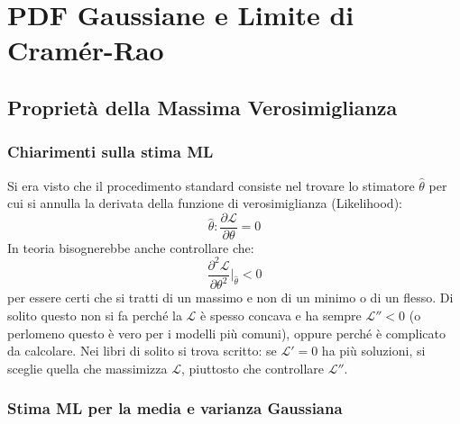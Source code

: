 \documentclass[openany,a4paper,12pt]{book}
\providecommand{\mathscr}[1]{\mathcal{#1}}
\theoremstyle{remark}
\begin{document}
\section{PDF Gaussiane e Limite di Cramér-Rao}

\subsection*{Proprietà della Massima Verosimiglianza}

\subsubsection*{Chiarimenti sulla stima ML}

Si era visto che il procedimento standard consiste nel trovare lo stimatore $\hat{\theta}$ per cui si annulla la derivata della funzione di verosimiglianza (Likelihood):
\begin{equation}
    \hat{\theta} : \frac{\partial \mathscr{L}}{\partial \theta} = 0
\end{equation}
In teoria bisognerebbe anche controllare che:
\begin{equation}
    \frac{\partial^2 \mathscr{L}}{\partial \theta^2} \Bigg|_{\hat{\theta}} < 0
\end{equation}
per essere certi che si tratti di un massimo e non di un minimo o di un flesso.
Di solito questo non si fa perché la $\mathscr{L}$ è spesso concava e ha sempre $\mathscr{L}'' < 0$ (o perlomeno questo è vero per i modelli più comuni), oppure perché è complicato da calcolare. Nei libri di solito si trova scritto: se $\mathscr{L}' = 0$ ha più soluzioni, si sceglie quella che massimizza $\mathscr{L}$, piuttosto che controllare $\mathscr{L}''$.

\subsubsection{Stima ML per la media e varianza Gaussiana}
\end{document}
